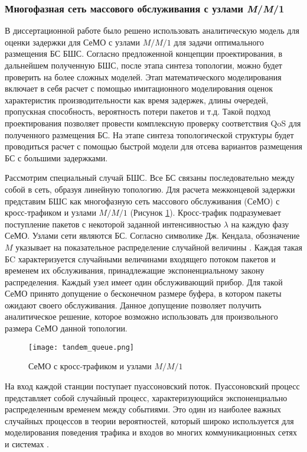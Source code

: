 \FloatBarrier
\subsubsection{Многофазная сеть массового обслуживания с узлами \textit{M}/\textit{M}/1}


В диссертационной работе было решено использовать аналитическую модель для оценки задержки для СеМО с узлами $M/M/1$ для задачи оптимального размещения БС БШС. Согласно предложенной концепции проектирования, в дальнейшем полученную БШС, после этапа синтеза топологии, можно будет проверить на более сложных моделей. Этап математического моделирования включает в себя расчет с помощью имитационного моделирования оценок характеристик производительности как время задержек, длины очередей, пропускная способность, вероятность потери пакетов и т.д. Такой подход проектирования позволяет провести комплексную проверку соответствия QoS для полученного размещения БС. На этапе синтеза топологической структуры будет проводиться расчет с помощью быстрой модели для отсева вариантов размещения БС с большими задержками.

Рассмотрим специальный случай БШС. Все БС связаны последовательно между собой в сеть, образуя линейную топологию. Для расчета межконцевой задержки представим БШС как многофазную сеть массового обслуживания (СеМО) с кросс-трафиком и узлами $M/M/1$ (Рисунок \cref{fig:tandem_queue}). Кросс-трафик подразумевает поступление пакетов с некоторой заданной интенсивностью $\lambda$ на каждую фазу СеМО. Узлами сети являются БС. Согласно символике Дж. Кендала, обозначение $M$ указывает на показательное распределение случайной величины \cite{VishnevskyBook, Kleinrock1975}. Каждая такая БC характеризуется случайными величинами входящего потоком пакетов и временем их обслуживания, принадлежащие экспоненциальному закону распределения. Каждый узел имеет один обслуживающий прибор. Для такой СеМО принято допущение о бесконечном размере буфера, в котором пакеты ожидают своего обслуживания. Данное допущение позволяет получить аналитическое решение, которое возможно использовать для произвольного размера СеМО данной топологии.

\begin{figure}[h!]
  \centering
   \texttt{[image: tandem\_queue.png]}
\caption{СеМО с кросс-трафиком и узлами $M/M/1$}
\label{fig:tandem_queue}
\end{figure}
 
На вход каждой станции поступает пуассоновский поток. Пуассоновский процесс представляет собой случайный процесс, характеризующийся  экспоненциально распределенным временем между событиями. Это один из наиболее важных случайных процессов в теории вероятностей, который широко используется для моделирования поведения трафика и входов во многих коммуникационных сетях и системах \cite{Kalor2018, Gao2016, Malandra2018, Seliem2019}. 

